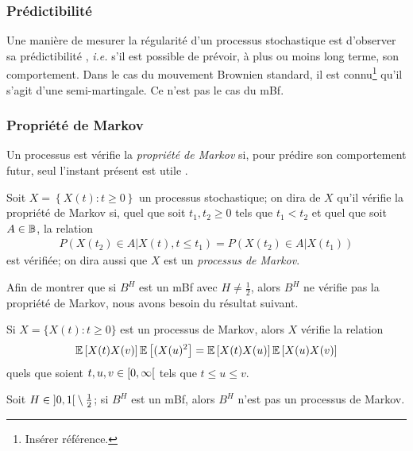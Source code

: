 \subsubsection{Prédictibilité}
\label{subsubsec:fBm-predictability}

Une manière de mesurer la régularité d'un processus stochastique est
d'observer sa \og prédictibilité \fg{}, \emph{i.e.} s'il est possible
de prévoir, à plus ou moins long terme, son comportement. Dans le cas
du mouvement Brownien standard, il est connu\footnote{Insérer
  référence.} qu'il s'agit d'une semi-martingale. Ce n'est pas le cas
du mBf.

\subsubsection{Propriété de Markov}
\label{subsubsec:fBm-markov}

Un processus est vérifie la \emph{propriété de Markov} si, pour
prédire son comportement futur, seul l'instant présent est \og utile
\fg.

\begin{definition}
  Soit $X = \left\{X(t) : t\geq 0\right\}$ un processus stochastique;
  on dira de $X$ qu'il vérifie la propriété de Markov si, quel que
  soit $t_1,t_2\geq 0$ tels que $t_1<t_2$ et quel que soit $A\in\mathbb{B}$,
  la relation
  \begin{align}
    P(X(t_2) \in A| X(t), t\leq t_1) = P(X(t_2) \in A|X(t_1))
  \end{align}
  est vérifiée; on dira aussi que $X$ est un \emph{processus de
    Markov}.
\end{definition}

Afin de montrer que si $B^H$ est un mBf avec $H\neq\frac{1}{2}$, alors
$B^H$ ne vérifie pas la propriété de Markov, nous avons besoin du
résultat suivant.

\begin{lemme}
  Si $X = \{X(t) : t\geq 0\}$ est un processus de Markov, alors $X$
  vérifie la relation
  \begin{align}
    \mathbb{E}\left[X(t)X(v)\right]\mathbb{E}\left[(X(u)^2\right] = \mathbb{E}\left[X(t)X(u)\right]\mathbb{E}\left[X(u)X(v)\right]
  \end{align}
  quels que soient $t,u,v\in\left[0,\infty\right[$ tels que
  $t\leq u\leq v$.
\end{lemme}

\begin{theoreme}
  Soit $H\in\left]0,1\right[\setminus\frac{1}{2}$; si $B^H$ est un mBf,
  alors $B^H$ n'est pas un processus de Markov.
\end{theoreme}

